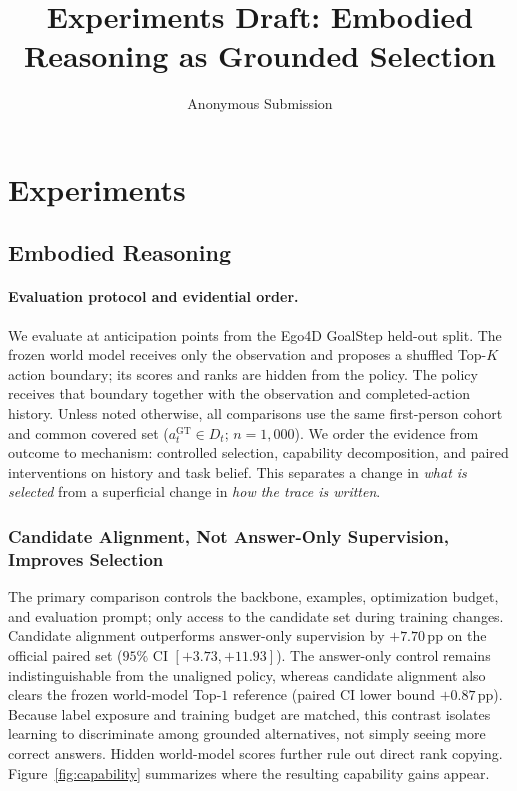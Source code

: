 \documentclass[letterpaper]{article}
\title{Experiments Draft: Embodied Reasoning as Grounded Selection}
\author{Anonymous Submission}
\affil{Anonymous Affiliation}
\newcommand{\obs}[1]{\textcolor{measuredblue}{#1}}
\newcommand{\pp}{\,\mathrm{pp}}
\begin{document}
\setlength{\emergencystretch}{1em}
\maketitle

\section{Experiments}
\subsection{Embodied Reasoning}
\label{sec:er-capability}

\paragraph{Evaluation protocol and evidential order.}
We evaluate at anticipation points from the Ego4D GoalStep held-out split.
The frozen world model receives only the observation and proposes a shuffled
Top-$K$ action boundary; its scores and ranks are hidden from the policy.  The
policy receives that boundary together with the observation and completed-action
history.  Unless noted otherwise, all comparisons use the same first-person
cohort and common covered set ($a_t^{\mathrm{GT}}\!\in D_t$;
\obs{$n{=}1{,}000$}).  We order the evidence from outcome to mechanism:
controlled selection, capability decomposition, and paired interventions on
history and task belief.  This separates a change in \emph{what is selected}
from a superficial change in \emph{how the trace is written}.

\subsubsection{Candidate Alignment, Not Answer-Only Supervision, Improves Selection}
\label{sec:er-selection}

The primary comparison controls the backbone, examples, optimization budget,
and evaluation prompt; only access to the candidate set during training
changes.  Candidate alignment outperforms answer-only supervision by
\obs{$+7.70\pp$} on the official paired set
(\obs{$95\%$ CI $[+3.73,+11.93]$}).  The answer-only control remains
indistinguishable from the unaligned policy, whereas candidate alignment also
clears the frozen world-model Top-\obs{$1$} reference (paired CI lower bound
\obs{$+0.87\pp$}).  Because label exposure and training budget are matched,
this contrast isolates learning to discriminate among grounded alternatives,
not simply seeing more correct answers.  Hidden world-model scores further
rule out direct rank copying.  Figure~\ref{fig:capability} summarizes where
the resulting capability gains appear.
\end{document}
